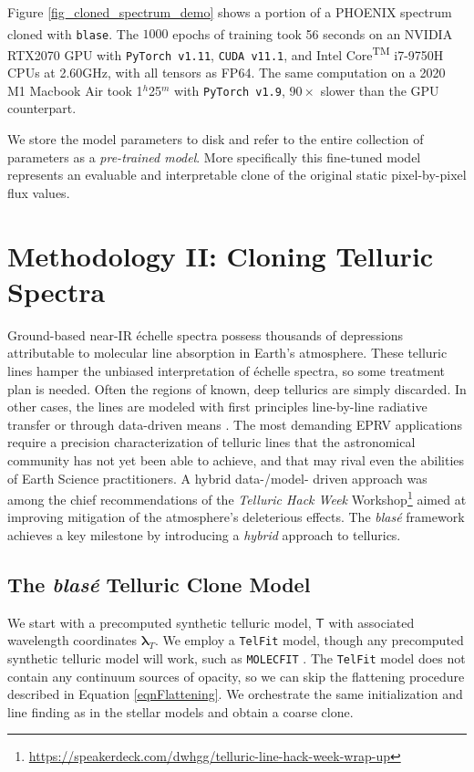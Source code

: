 \documentclass[twocolumn]{aastex631}
\begin{document}
Figure \ref{fig_cloned_spectrum_demo} shows a portion of a PHOENIX spectrum cloned with \texttt{blase}. The $1000$ epochs of training took 56 seconds on an NVIDIA\textsuperscript{\tiny\textregistered} RTX2070 GPU with \texttt{PyTorch v1.11}, \texttt{CUDA v11.1}, and Intel\textsuperscript{\tiny\textregistered} Core\textsuperscript{\tiny TM} i7-9750H CPUs at 2.60GHz, with all tensors as FP64. The same computation on a 2020 M1 Macbook Air took 1$^h$25$^m$ with \texttt{PyTorch v1.9}, $90\times$ slower than the GPU counterpart.

We store the model parameters to disk and refer to the entire collection of parameters as a \emph{pre-trained model}.  More specifically this fine-tuned model represents an evaluable and interpretable clone of the original static pixel-by-pixel flux values.

\section{Methodology II: Cloning Telluric Spectra} \label{sectionTelluric}
Ground-based near-IR \'echelle spectra possess thousands of depressions attributable to molecular line absorption in Earth's atmosphere.  These telluric lines hamper the unbiased interpretation of \'echelle spectra, so some treatment plan is needed.  Often the regions of known, deep tellurics are simply discarded.  In other cases, the lines are modeled with first principles line-by-line radiative transfer \citep[\emph{e.g.} \texttt{TelFit,}][]{2014AJ....148...53G, 2005JQSRT..91..233C} or through data-driven means \citep[\emph{e.g.} \texttt{wobble,}][]{2019AJ....158..164B}.  The most demanding EPRV applications require a precision characterization of telluric lines that the astronomical community has not yet been able to achieve, and that may rival even the abilities of Earth Science practitioners.  A hybrid data-/model- driven approach was among the chief recommendations of the \emph{Telluric Hack Week} Workshop\footnote{\url{https://speakerdeck.com/dwhgg/telluric-line-hack-week-wrap-up}} aimed at improving mitigation of the atmosphere's deleterious effects.  The  \emph{blas\'e} framework achieves a key milestone by introducing a \emph{hybrid} approach to tellurics.

\subsection{The  \emph{blas\'e} Telluric Clone Model}
We start with a precomputed synthetic telluric model, $\mathsf{T}$ with associated wavelength coordinates $\bm{\lambda}_T$.  We employ a \texttt{TelFit} model, though any precomputed synthetic telluric model will work, such as \texttt{MOLECFIT} \citep{2015A&A...576A..77S}.  The \texttt{TelFit} model does not contain any continuum sources of opacity, so we can skip the flattening procedure described in Equation \ref{eqnFlattening}.  We orchestrate the same initialization and line finding as in the stellar models and obtain a coarse clone.
\end{document}
